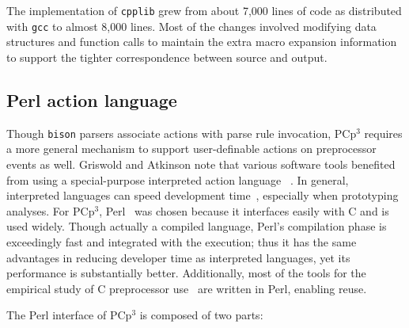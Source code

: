 \documentclass{article}
\newcommand{\pcp}{\mbox{\textsf{PCp}$^3$}}
\newcommand{\Cpp}{\mbox{\textsf{cpp}}}
\newcommand{\Perl}{\mbox{Perl}}
\newcommand{\C}{\mbox{C}}
\begin{document}


The implementation of \texttt{cpplib} grew from about 7,000 lines of
code as distributed with \texttt{gcc} to almost 8,000 lines.  Most of
the changes involved modifying data structures and function calls to
maintain the extra macro expansion information to support the
tighter correspondence between source and output.  

\subsection{Perl action language}

Though \texttt{bison} parsers associate actions with parse rule
invocation, \pcp{} requires a more general mechanism to support
user-definable actions on preprocessor events as well. Griswold and
Atkinson note that various software tools benefited from using a
special-purpose interpreted action language ~\cite{Griswold96}.  In
general, interpreted languages can speed development
time~\cite{Scripting}, especially when prototyping analyses. For \pcp{},
\Perl{}~\cite{Perl,Camel} was chosen because it interfaces easily with
\C{} and is used widely. Though actually a compiled language, \Perl{}'s
compilation phase is exceedingly fast and integrated with the execution;
thus it has the same advantages in reducing developer time as
interpreted languages, yet its performance is substantially better.
Additionally, most of the tools for the empirical study of \C{}
preprocessor use~\cite{EmpCpp} are written in \Perl{}, enabling reuse.

The \Perl{} interface of \pcp{} is composed of two parts:
\end{document}
